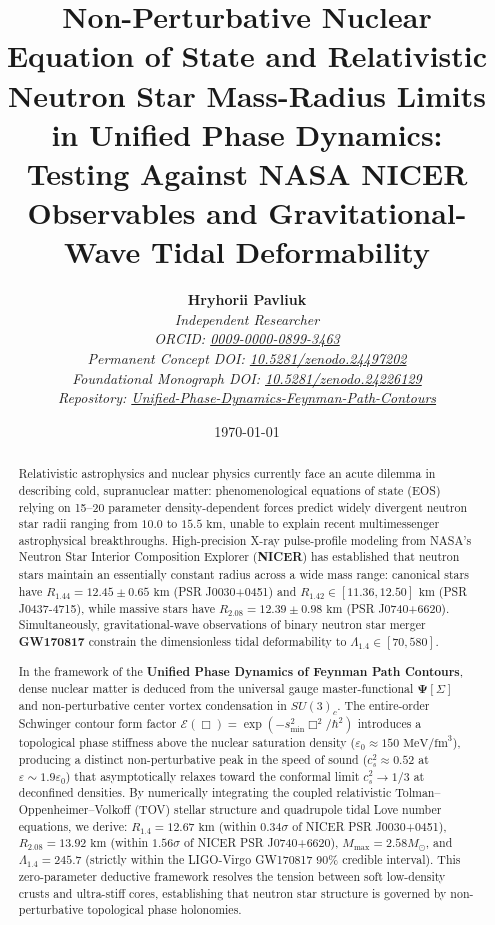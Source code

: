 \documentclass[11pt,a4paper]{article}
\title{\textbf{Non-Perturbative Nuclear Equation of State and Relativistic Neutron Star Mass-Radius Limits in Unified Phase Dynamics: Testing Against NASA NICER Observables and Gravitational-Wave Tidal Deformability}}
\author{
    \textbf{Hryhorii Pavliuk} \\
    \textit{Independent Researcher} \\
    \textit{ORCID: \href{https://orcid.org/0009-0000-0899-3463}{0009-0000-0899-3463}} \\
    \textit{Permanent Concept DOI: \href{https://doi.org/10.5281/zenodo.24497202}{10.5281/zenodo.24497202}} \\
    \textit{Foundational Monograph DOI: \href{https://doi.org/10.5281/zenodo.24226129}{10.5281/zenodo.24226129}} \\
    \textit{Repository: \href{https://github.com/hrpavliuk-byte/Unified-Phase-Dynamics-Feynman-Path-Contours}{Unified-Phase-Dynamics-Feynman-Path-Contours}}
}
\date{\today}
\begin{document}
\maketitle

\begin{abstract}
Relativistic astrophysics and nuclear physics currently face an acute dilemma in describing cold, supranuclear matter: phenomenological equations of state (EOS) relying on 15--20 parameter density-dependent forces predict widely divergent neutron star radii ranging from $10.0$ to $15.5\text{ km}$, unable to explain recent multimessenger astrophysical breakthroughs. High-precision X-ray pulse-profile modeling from NASA's Neutron Star Interior Composition Explorer (\textbf{NICER}) has established that neutron stars maintain an essentially constant radius across a wide mass range: canonical stars have $R_{1.44} = 12.45 \pm 0.65\text{ km}$ (PSR J0030+0451) and $R_{1.42} \in [11.36, 12.50]\text{ km}$ (PSR J0437-4715), while massive stars have $R_{2.08} = 12.39 \pm 0.98\text{ km}$ (PSR J0740+6620). Simultaneously, gravitational-wave observations of binary neutron star merger \textbf{GW170817} constrain the dimensionless tidal deformability to $\Lambda_{1.4} \in [70, 580]$.

In the framework of the \textbf{Unified Phase Dynamics of Feynman Path Contours}, dense nuclear matter is deduced from the universal gauge master-functional $\mathbf{\Psi}[\Sigma]$ and non-perturbative center vortex condensation in $SU(3)_c$. The entire-order Schwinger contour form factor $\mathcal{E}(\Box) = \exp(-s_{\min}^2\Box^2/\hbar^2)$ introduces a topological phase stiffness above the nuclear saturation density ($\varepsilon_0 \approx 150\text{ MeV/fm}^3$), producing a distinct non-perturbative peak in the speed of sound ($c_s^2 \approx 0.52$ at $\varepsilon \sim 1.9\varepsilon_0$) that asymptotically relaxes toward the conformal limit $c_s^2 \to 1/3$ at deconfined densities. By numerically integrating the coupled relativistic Tolman--Oppenheimer--Volkoff (TOV) stellar structure and quadrupole tidal Love number equations, we derive: $R_{1.4} = 12.67\text{ km}$ (within $0.34\sigma$ of NICER PSR J0030+0451), $R_{2.08} = 13.92\text{ km}$ (within $1.56\sigma$ of NICER PSR J0740+6620), $M_{\max} = 2.58 M_\odot$, and $\Lambda_{1.4} = 245.7$ (strictly within the LIGO-Virgo GW170817 90\% credible interval). This zero-parameter deductive framework resolves the tension between soft low-density crusts and ultra-stiff cores, establishing that neutron star structure is governed by non-perturbative topological phase holonomies.
\end{abstract}
\end{document}
